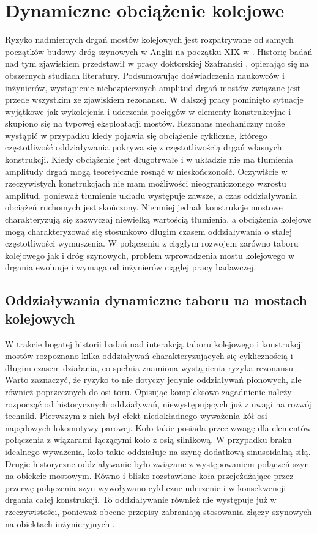 \section{Dynamiczne obciążenie kolejowe}
Ryzyko nadmiernych drgań mostów kolejowych jest rozpatrywane od samych początków budowy dróg szynowych w Anglii na początku XIX w \parencite{Ladislav1996}. Historię badań nad tym zjawiskiem przedstawił w pracy doktorskiej Szafranski \cite{Szafranski2013}, opierając się na obszernych studiach literatury. Podsumowując doświadczenia naukowców i inżynierów, wystąpienie niebezpiecznych amplitud drgań mostów związane jest przede wszystkim ze zjawiskiem rezonansu. W dalszej pracy pominięto sytuacje wyjątkowe jak wykolejenia i uderzenia pociągów w elementy konstrukcyjne i skupiono się na typowej eksploatacji mostów. Rezonans mechaniczny może wystąpić w przypadku kiedy pojawia się obciążenie cykliczne, którego częstotliwość oddziaływania pokrywa się z częstotliwością drgań własnych konstrukcji. Kiedy obciążenie jest długotrwałe i w układzie nie ma tłumienia amplitudy drgań mogą teoretycznie rosnąć w nieskończoność. Oczywiście w rzeczywistych konstrukcjach nie mam możliwości nieograniczonego wzrostu amplitud, ponieważ tłumienie układu występuje zawsze, a czas oddziaływania obciążeń ruchomych jest skończony. Niemniej jednak konstrukcje mostowe charakteryzują się zazwyczaj niewielką wartością tłumienia, a obciążenia kolejowe mogą charakteryzować się stosunkowo długim czasem oddziaływania o stałej częstotliwości wymuszenia. W połączeniu z ciągłym rozwojem zarówno taboru kolejowego jak i dróg szynowych, problem wprowadzenia mostu kolejowego w drgania ewoluuje i wymaga od inżynierów ciągłej pracy badawczej.


\subsection{Oddziaływania dynamiczne taboru na mostach kolejowych}
W trakcie bogatej historii badań nad interakcją taboru kolejowego i konstrukcji mostów rozpoznano kilka oddziaływań charakteryzujących się cyklicznością i długim czasem działania, co spełnia znamiona wystąpienia ryzyka rezonansu \parencite{Fryba2001}. Warto zaznaczyć, że ryzyko to nie dotyczy jedynie oddziaływań pionowych, ale również poprzecznych do osi toru. Opisując kompleksowo zagadnienie należy rozpocząć od historycznych oddziaływań, niewystępujących już z uwagi na rozwój techniki. Pierwszym z nich był efekt niedokładnego wyważenia kół osi napędowych lokomotywy parowej. Koło takie posiada przeciwwagę dla elementów połączenia z wiązarami łączącymi koło z osią silnikową. W przypadku braku idealnego wyważenia, koło takie oddziałuje na szynę dodatkową sinusoidalną siłą. Drugie historyczne oddziaływanie było związane z występowaniem połączeń szyn na obiekcie mostowym. Równo i blisko rozstawione koła przejeżdżające przez przerwę połączenia szyn wywoływano cykliczne uderzenie i w konsekwencji drgania całej konstrukcji. To oddziaływanie również nie występuje już w rzeczywistości, ponieważ obecne przepisy zabraniają stosowania złączy szynowych na obiektach inżynieryjnych \parencite{PKPPolskieLinieKolejoweS.A.2005}.

